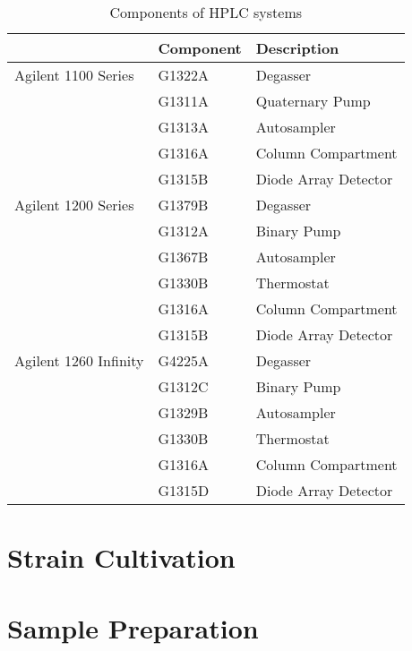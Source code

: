 \begin{table}[H]
	\caption{Components of HPLC systems}
	\label{tab:HPLCtab}
	\centering
	\begin{tabularx}{\textwidth}{XXX}
						& \textbf{Component}		& \textbf{Description}	\\
		\midrule
		Agilent 1100 Series		&	G1322A		&	Degasser			\\
								&	G1311A		&	Quaternary Pump		\\
								&	G1313A		&	Autosampler			\\
								&	G1316A		&	Column Compartment	\\
								&	G1315B		&	Diode Array Detector	\\
		Agilent 1200 Series		&	G1379B		&	Degasser			\\
								&	G1312A		&	Binary Pump			\\
								&	G1367B		&	Autosampler			\\
								&	G1330B		&	Thermostat			\\
								&	G1316A		&	Column Compartment	\\
								&	G1315B		&	Diode Array Detector	\\
		Agilent 1260 Infinity	&	G4225A		&	Degasser			\\
								&	G1312C		&	Binary Pump			\\
								&	G1329B		&	Autosampler			\\
								&	G1330B		&	Thermostat			\\
								&	G1316A		&	Column Compartment	\\
								&	G1315D		&	Diode Array Detector	\\


		\bottomrule
	\end{tabularx}
\end{table}


\section{Strain Cultivation} %
\label{sec:strain_cultivation}


\section{Sample Preparation} %
\label{sec:sample_preparation}

